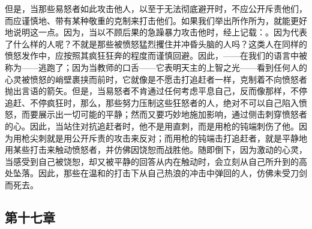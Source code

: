 但是，当那些易怒者如此攻击他人，以至于无法彻底避开时，不应公开斥责他们，而应谨慎地、带有某种敬重的克制来打击他们。如果我们举出所作所为，就能更好地说明这一点。因为，当以不顾后果的急躁暴力攻击他时，经上记载：\newline{}。因为代表了什么样的人呢？不就是那些被愤怒猛烈攫住并冲昏头脑的人吗？这类人在同样的愤怒发作中，应按照其疯狂狂奔的程度而谨慎回避。因此，——在我们的语言中被称为——逃跑了；因为当教师的口舌——它表明天主的上智之光——看到任何人的心灵被愤怒的峭壁裹挟而前时，它就像是不愿击打追赶者一样，克制着不向愤怒者抛出言语的箭矢。但是，当易怒者不肯通过任何考虑平息自己，反而像那样，不停追赶、不停疯狂时，那么，那些努力压制这些狂怒者的人，绝对不可以自己陷入愤怒，而要展示出一切可能的平静；然而又要巧妙地施加影响，通过侧击刺穿愤怒者的心。因此，当站住对抗追赶者时，他不是用直刺，而是用枪的钝端刺伤了他。因为用枪尖刺就是用公开斥责的攻击来反对；而用枪的钝端击打追赶者，就是平静地用某些打击来触动愤怒者，并仿佛因饶恕而战胜他。随即倒下，因为激动的心灵，当感受到自己被饶恕，却又被平静的回答从内在触动时，会立刻从自己所升到的高处坠落。因此，那些在温和的打击下从自己热浪的冲击中弹回的人，仿佛未受刀剑而死去。\par


\subsection{第十七章}

\par

